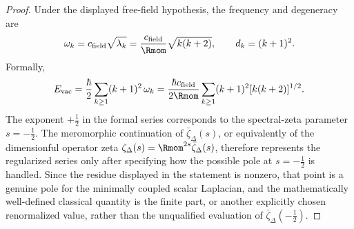\documentclass[11pt,a4paper]{article}
\begin{document}
\begin{proof}
Under the displayed free-field hypothesis, the frequency and degeneracy are
\[
 \omega_k
 =
 c_{\rm field}\sqrt{\lambda_k}
 =
 \frac{c_{\rm field}}{\Rmom}\sqrt{k(k+2)},
 \qquad
 d_k=(k+1)^2.
\]
Formally,
\[
E_{\mathrm{vac}}
=\frac{\hbar}{2}\sum_{k\ge1}(k+1)^2\,\omega_k
=\frac{\hbar c_{\rm field}}{2\Rmom}
\sum_{k\ge1}(k+1)^2[k(k+2)]^{1/2}.
\]
The exponent \(+\tfrac12\) in the formal series corresponds to the spectral-zeta parameter \(s=-\tfrac12\).  The meromorphic continuation of \(\bar\zeta_\Delta(s)\), or equivalently of the dimensionful operator zeta \(\zeta_\Delta(s)=\Rmom^{2s}\bar\zeta_\Delta(s)\), therefore represents the regularized series only after specifying how the possible pole at \(s=-\tfrac12\) is handled.  Since the residue displayed in the statement is nonzero, that point is a genuine pole for the minimally coupled scalar Laplacian, and the mathematically well-defined classical quantity is the finite part, or another explicitly chosen renormalized value, rather than the unqualified evaluation of \(\bar\zeta_\Delta(-\tfrac12)\).
\end{proof}
\end{document}
